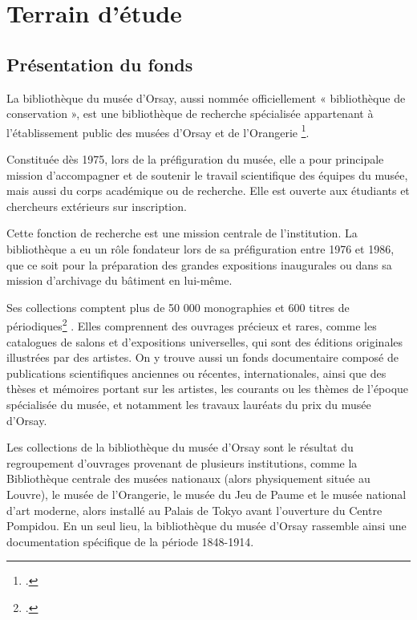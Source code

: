 
\section{Terrain d'étude}

\subsection{Présentation du fonds}


La bibliothèque du musée d'Orsay, aussi nommée officiellement « bibliothèque de conservation », est une bibliothèque de recherche spécialisée appartenant à l'établissement public des musées d'Orsay et de l'Orangerie \footcite{reseaubibart}. 

Constituée dès 1975, lors de la préfiguration du musée, elle a pour principale mission d'accompagner et de soutenir le travail scientifique des équipes du musée, mais aussi du corps académique ou de recherche. Elle est ouverte aux étudiants et chercheurs extérieurs sur inscription.


Cette fonction de recherche est une mission centrale de l'institution. La bibliothèque a eu un rôle fondateur lors de sa préfiguration entre 1976 et 1986, que ce soit pour la préparation des grandes expositions inaugurales ou dans sa mission d'archivage du bâtiment en lui-même.

Ses collections comptent plus de 50 000 monographies et 600 titres de périodiques\footcite{museeorsay} . Elles comprennent des ouvrages précieux et rares, comme les catalogues de salons et d'expositions universelles, qui sont des éditions originales illustrées par des artistes. On y trouve aussi un fonds documentaire composé de publications scientifiques anciennes ou récentes, internationales, ainsi que des thèses et mémoires portant sur les artistes, les courants ou les thèmes de l'époque spécialisée du musée, et notamment les travaux lauréats du prix du musée d'Orsay.

Les collections de la bibliothèque du musée d'Orsay sont le résultat du regroupement d'ouvrages provenant de plusieurs institutions, comme la Bibliothèque centrale des musées nationaux (alors physiquement située au Louvre), le musée de l'Orangerie, le musée du Jeu de Paume et le musée national d'art moderne, alors installé au Palais de Tokyo avant l'ouverture du Centre Pompidou. En un seul lieu, la bibliothèque du musée d'Orsay rassemble ainsi une documentation spécifique de la période 1848-1914.


